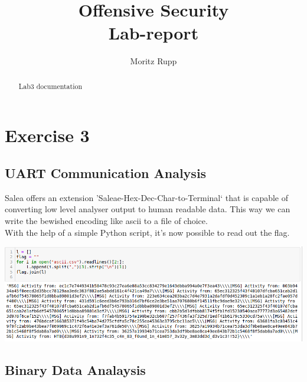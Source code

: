 \documentclass[a4paper,10pt]{article}
\title{Offensive Security\\
	Lab-report
}
\author{Moritz Rupp}
\begin{document}
\maketitle
\tableofcontents
\begin{abstract}
Lab3 documentation
\end{abstract}
\newpage
\section{Exercise 3}
\subsection{UART Communication Analysis}
Salea offers an extension 'Saleae-Hex-Dec-Char-to-Terminal` that is capable of converting low level analyser output to human readable data. This way we can write the bewished encoding like ascii to a file of choice.\\
With the help of a simple Python script, it's now possible to read out the flag.
\begin{center}
 \includegraphics[scale=0.4]{3.1.png}
\end{center}
\subsection{Binary Data Analaysis}
\end{document}

